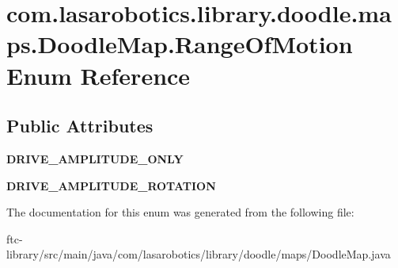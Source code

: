 \hypertarget{enumcom_1_1lasarobotics_1_1library_1_1doodle_1_1maps_1_1_doodle_map_1_1_range_of_motion}{}\section{com.\+lasarobotics.\+library.\+doodle.\+maps.\+Doodle\+Map.\+Range\+Of\+Motion Enum Reference}
\label{enumcom_1_1lasarobotics_1_1library_1_1doodle_1_1maps_1_1_doodle_map_1_1_range_of_motion}
\subsection*{Public Attributes}
\begin{DoxyCompactItemize}
\item 
\hypertarget{enumcom_1_1lasarobotics_1_1library_1_1doodle_1_1maps_1_1_doodle_map_1_1_range_of_motion_a1601259e5d1d3ba6b589fa7047b5f1db}{}{\bfseries D\+R\+I\+V\+E\+\_\+\+A\+M\+P\+L\+I\+T\+U\+D\+E\+\_\+\+O\+N\+L\+Y}\label{enumcom_1_1lasarobotics_1_1library_1_1doodle_1_1maps_1_1_doodle_map_1_1_range_of_motion_a1601259e5d1d3ba6b589fa7047b5f1db}

\item 
\hypertarget{enumcom_1_1lasarobotics_1_1library_1_1doodle_1_1maps_1_1_doodle_map_1_1_range_of_motion_a4fdbab7e6d4c4b0a7527668096bc23e0}{}{\bfseries D\+R\+I\+V\+E\+\_\+\+A\+M\+P\+L\+I\+T\+U\+D\+E\+\_\+\+R\+O\+T\+A\+T\+I\+O\+N}\label{enumcom_1_1lasarobotics_1_1library_1_1doodle_1_1maps_1_1_doodle_map_1_1_range_of_motion_a4fdbab7e6d4c4b0a7527668096bc23e0}

\end{DoxyCompactItemize}


The documentation for this enum was generated from the following file\+:\begin{DoxyCompactItemize}
\item 
ftc-\/library/src/main/java/com/lasarobotics/library/doodle/maps/Doodle\+Map.\+java\end{DoxyCompactItemize}
